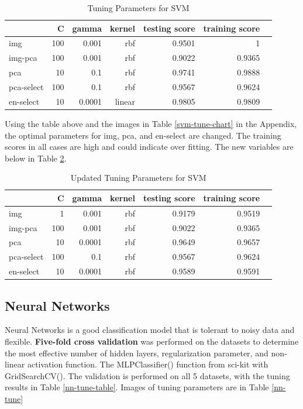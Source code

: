 \documentclass{article}
\begin{document}
\begin{table}[H]
\centering
    \begin{tabular}{lrrrrrr}\toprule
    &C &gamma &kernel & testing score & training score \\\midrule
    img &100 &0.001 &rbf &0.9501 & 1 \\
    img-pca &100 &0.001 &rbf &0.9022 & 0.9365 \\
    pca &10 &0.1 &rbf &0.9741 &0.9888 \\
    pca-select &100 &0.1 &rbf &0.9567 &0.9624 \\
    en-select &10 &0.0001 &linear &0.9805 &0.9809 \\
    \bottomrule
    \end{tabular}
    \caption{Tuning Parameters for SVM} \label{svm-table}
\end{table}

Using the table above and the images in Table \ref{svm-tune-chart} in the Appendix, the optimal parameters for img, pca, and en-select are changed. The training scores in all cases are high and could indicate over fitting. The new variables are below in Table \ref{svm-table-up}.

\begin{table}[H]
\centering
    \begin{tabular}{lrrrrrr}\toprule
    &C &gamma &kernel & testing score & training score \\\midrule
    img & 1 &0.001 &rbf &0.9179 & 0.9519 \\
    img-pca &100 &0.001 &rbf &0.9022 & 0.9365 \\
    pca &10 & 0.0001 &rbf & 0.9649 & 0.9657 \\
    pca-select &100 &0.1 &rbf &0.9567 &0.9624 \\
    en-select &10 &0.0001 &rbf & 0.9589 & 0.9591 \\
    \bottomrule
    \end{tabular}
    \caption{Updated Tuning Parameters for SVM} \label{svm-table-up}
\end{table}


\subsection{Neural Networks}

Neural Networks is a good classification model that is tolerant to noisy data and flexible. \textbf{Five-fold cross validation} was performed on the datasets to determine the most effective number of hidden layers, regularization parameter, and non-linear activation function. The MLPClassifier() function from sci-kit with GridSearchCV(). The validation is performed on all 5 datasets, with the tuning results in Table \ref{nn-tune-table}. Images of tuning parameters are in Table \ref{nn-tune}\\
\end{document}
